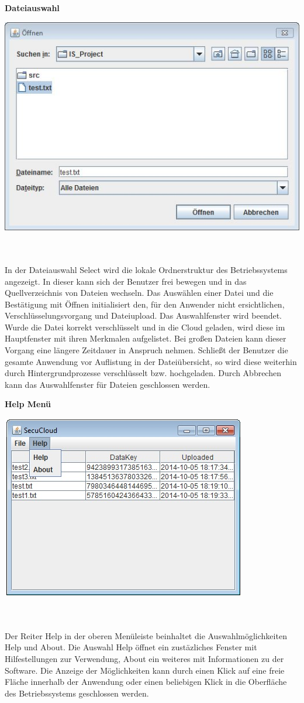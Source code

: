 \documentclass[12pt,a4paper,bibliography=totocnumbered,listof=totocnumbered]{scrartcl}
\begin{document}
\textbf{Dateiauswahl}
\vspace{1em}
$\;$\\
\begin{minipage}{\linewidth}
	\centering
	\includegraphics[width=0.4\linewidth]{Select.jpg}
	\label{Select}
\end{minipage}
\\\\In der Dateiauswahl Select wird die lokale Ordnerstruktur des Betriebssystems angezeigt. In dieser kann sich der Benutzer frei bewegen und in das Quellverzeichnis von Dateien wechseln. Das Auswählen einer Datei und die Bestätigung mit Öffnen initialisiert den, für den Anwender nicht ersichtlichen, Verschlüsselungsvorgang und Dateiupload. Das Auswahlfenster wird beendet. Wurde die Datei korrekt verschlüsselt und in die Cloud geladen, wird diese im Hauptfenster mit ihren Merkmalen aufgelistet. Bei großen Dateien kann dieser Vorgang eine längere Zeitdauer in Anspruch nehmen. Schließt der Benutzer die gesamte Anwendung vor Auflistung in der Dateiübersicht, so wird diese weiterhin durch Hintergrundprozesse verschlüsselt bzw. hochgeladen. Durch Abbrechen kann das Auswahlfenster für Dateien geschlossen werden.

\textbf{Help Menü}
\vspace{1em}
$\;$\\
\begin{minipage}{\linewidth}
	\centering
	\includegraphics[width=0.4\linewidth]{Help.jpg}
	\label{Help}
\end{minipage}
\\\\Der Reiter Help in der oberen Menüleiste beinhaltet die Auswahlmöglichkeiten Help und About. Die Auswahl Help öffnet ein zustäzliches Fenster mit Hilfestellungen zur Verwendung, About ein weiteres mit Informationen zu der Software. Die Anzeige der Möglichkeiten kann durch einen Klick auf eine freie Fläche innerhalb der Anwendung oder einen beliebigen Klick in die Oberfläche des Betriebssystems geschlossen werden.
\end{document}
